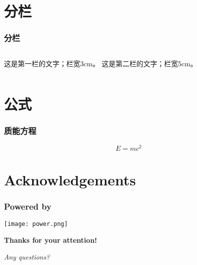 \section{分栏}
\begin{frame}
	\frametitle{分栏}
	\begin{columns}
	\column{3cm}
	这是第一栏的文字；栏宽3cm。
	\column{5cm}
	这是第二栏的文字；栏宽5cm。
	\end{columns}
\end{frame}

\section{公式}
\begin{frame}
	\frametitle{质能方程}
	\begin{equation}
	E=mc^2
	\label{emc}
	\end{equation}
\end{frame}

\begin{frame}
\end{frame}

\section*{Acknowledgements}
\begin{frame}
	\frametitle{Powered by}
	\begin{center}
		\texttt{[image: power.png]}
	\end{center}
\end{frame}

\begin{frame}[plain]
	\begin{spacing}{1.5}
	\begin{center}
	\Huge{\textbf{Thanks for your attention!}}

	\Huge{\textit{Any questions?}}
\end{center}
\end{spacing}
\end{frame}


